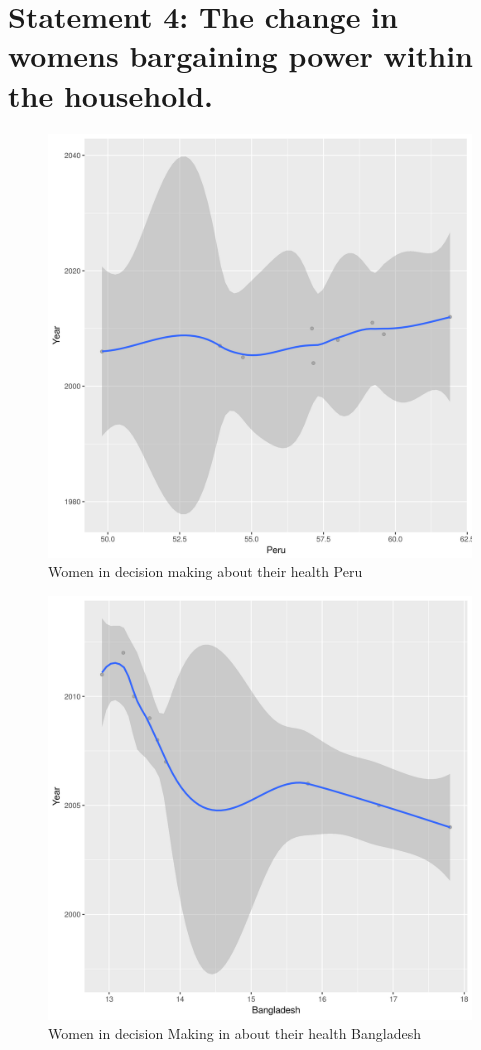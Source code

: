 \documentclass[12pt]{article}
\begin{document}
\section{Statement 4: The change in womens bargaining power within the household.}


\begin{figure}[h!]
\caption{Women in decision making about their health Peru}
\centering
\includegraphics[scale=.5]{quest4Peru.png}
\end{figure}
\clearpage

\begin{figure}[h!]
\caption{Women in decision Making in about their health Bangladesh }
\centering
\includegraphics[scale=.5]{quest4Bangladesh.png}
\end{figure}
\clearpage
\end{document}
